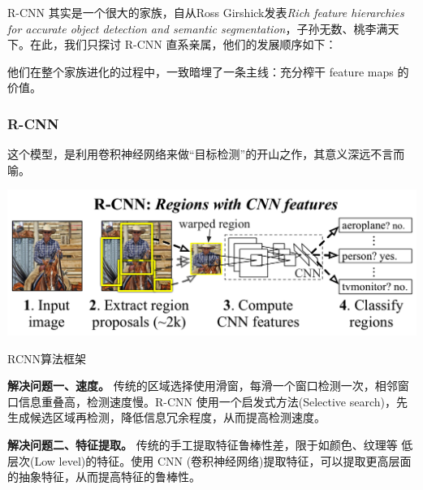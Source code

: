 R-CNN 其实是一个很大的家族，自从Ross Girshick发表\textit{Rich feature hierarchies for accurate object detection and semantic segmentation}\cite{rcnn}，子孙无数、桃李满天下。在此，我们只探讨 R-CNN 直系亲属，他们的发展顺序如下：

\vspace{10pt}


他们在整个家族进化的过程中，一致暗埋了一条主线：充分榨干 feature maps 的价值。

\subsubsection{R-CNN}
这个模型，是利用卷积神经网络来做“目标检测”的开山之作，其意义深远不言而喻。
\begin{uscfigure}
	\includegraphics[width=\textwidth]{./Pictures/rcnn-regions_with_cnn_features.png}	
	\caption{RCNN算法框架}
\end{uscfigure}

\textbf{解决问题一、速度。}
传统的区域选择使用滑窗，每滑一个窗口检测一次，相邻窗口信息重叠高，检测速度慢。R-CNN 使用一个启发式方法(Selective search)，先生成候选区域再检测，降低信息冗余程度，从而提高检测速度。

\textbf{解决问题二、特征提取。}
传统的手工提取特征鲁棒性差，限于如颜色、纹理等 低层次(Low level)的特征。使用 CNN (卷积神经网络)提取特征，可以提取更高层面的抽象特征，从而提高特征的鲁棒性。

